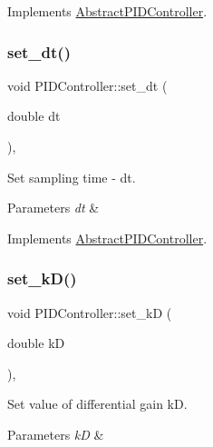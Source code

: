 Implements \hyperlink{classAbstractPIDController}{Abstract\+P\+I\+D\+Controller}.

\mbox{\label{classPIDController_a04c753e2ff22f62017f82e0e4143493b}} 
\subsubsection{\texorpdfstring{set\+\_\+dt()}{set\_dt()}}
{\footnotesize\ttfamily void P\+I\+D\+Controller\+::set\+\_\+dt (\begin{DoxyParamCaption}\item[{double}]{dt }\end{DoxyParamCaption})\hspace{0.3cm}{\ttfamily [override]}, {\ttfamily [virtual]}}



Set sampling time -\/ dt. 


\begin{DoxyParams}{Parameters}
{\em dt} & \\
\hline
\end{DoxyParams}


Implements \hyperlink{classAbstractPIDController}{Abstract\+P\+I\+D\+Controller}.

\mbox{\label{classPIDController_a88adb39de00d22b72a8a33716fc1c117}} 
\subsubsection{\texorpdfstring{set\+\_\+k\+D()}{set\_kD()}}
{\footnotesize\ttfamily void P\+I\+D\+Controller\+::set\+\_\+kD (\begin{DoxyParamCaption}\item[{double}]{kD }\end{DoxyParamCaption})\hspace{0.3cm}{\ttfamily [override]}, {\ttfamily [virtual]}}



Set value of differential gain kD. 


\begin{DoxyParams}{Parameters}
{\em kD} & \\
\hline
\end{DoxyParams}


